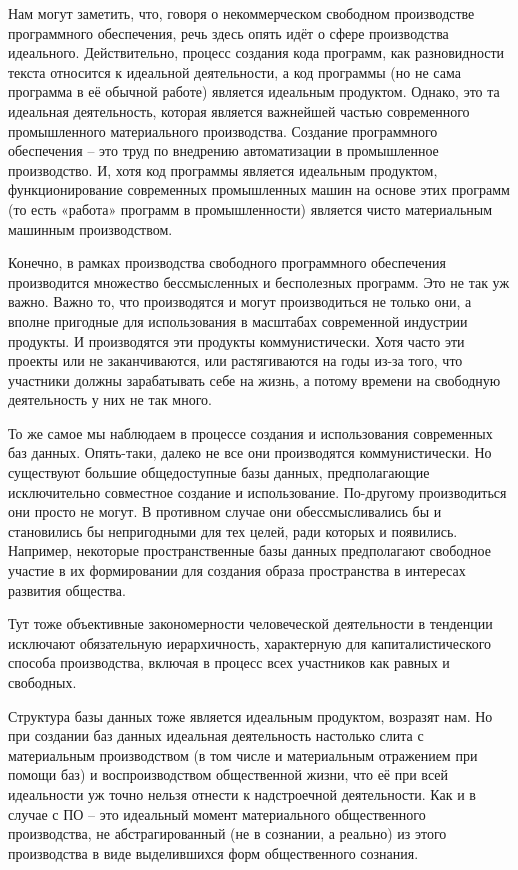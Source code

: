 \documentclass[../main]{subfiles}
\begin{document}
Нам могут заметить, что, говоря о некоммерческом свободном производстве программного обеспечения, речь здесь опять идёт о сфере производства идеального. Действительно, процесс создания кода программ, как разновидности текста относится к идеальной деятельности, а код программы (но не сама программа в её обычной работе) является идеальным продуктом. Однако, это та идеальная деятельность, которая является важнейшей частью современного промышленного материального производства. Создание программного обеспечения – это труд по внедрению автоматизации в промышленное производство. И, хотя код программы является идеальным продуктом, функционирование современных промышленных машин на основе этих программ (то есть «работа» программ в промышленности) является чисто материальным машинным производством.

Конечно, в рамках производства свободного программного обеспечения производится множество бессмысленных и бесполезных программ. Это не так уж важно. Важно то, что производятся и могут производиться не только они, а вполне пригодные для использования в масштабах современной индустрии продукты. И производятся эти продукты коммунистически. Хотя часто эти проекты или не заканчиваются, или растягиваются на годы из-за того, что участники должны зарабатывать себе на жизнь, а потому времени на свободную деятельность у них не так много.

То же самое мы наблюдаем в процессе создания и использования современных баз данных. Опять-таки, далеко не все они производятся коммунистически. Но существуют большие общедоступные базы данных, предполагающие исключительно совместное создание и использование. По-другому производиться они просто не могут. В противном случае они обессмысливались бы и становились бы непригодными для тех целей, ради которых и появились. Например, некоторые пространственные базы данных предполагают свободное участие в их формировании для создания образа пространства в интересах развития общества.

Тут тоже объективные закономерности человеческой деятельности в тенденции исключают обязательную иерархичность, характерную для капиталистического способа производства, включая в процесс всех участников как равных и свободных.

Структура базы данных тоже является идеальным продуктом, возразят нам. Но при создании баз данных идеальная деятельность настолько слита с материальным производством (в том числе и материальным отражением при помощи баз) и воспроизводством общественной жизни, что её при всей идеальности уж точно нельзя отнести к надстроечной деятельности. Как и в случае с ПО – это идеальный момент материального общественного производства, не абстрагированный (не в сознании, а реально) из этого производства в виде выделившихся форм общественного сознания.
\end{document}
